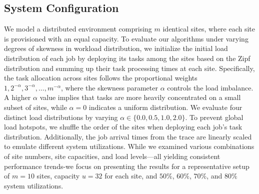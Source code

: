 \subsection{System Configuration}
We model a distributed environment comprising $m$ identical sites, where each site is provisioned with an equal capacity. To evaluate our algorithms under varying degrees of skewness in workload distribution, we initialize the initial load distribution of each job by deploying its tasks among the sites based on the Zipf distribution and summing up their task processing times at each site. Specifically, the task allocation across sites follows the proportional weights $1, 2^{-\alpha}, 3^{-\alpha}, \dots, m^{-\alpha}$, where the skewness parameter $\alpha$ controls the load imbalance. A higher $\alpha$ value implies that tasks are more heavily concentrated on a small subset of sites, while $\alpha = 0$ indicates a uniform distribution. We evaluate four distinct load distributions by varying $\alpha \in \{0.0, 0.5, 1.0, 2.0\}$. To prevent global load hotspots, we shuffle the order of the sites when deploying each job's task distribution. Additionally, the job arrival times from the trace are linearly scaled to emulate different system utilizations. While we examined various combinations of site numbers, site capacities, and load levels—all yielding consistent performance trends-we focus on presenting the results for a representative setup of $m = 10$ sites, capacity $u=32$ for each site, and $50\%$, $60\%$, $70\%$, and $80\%$ system utilizations.


